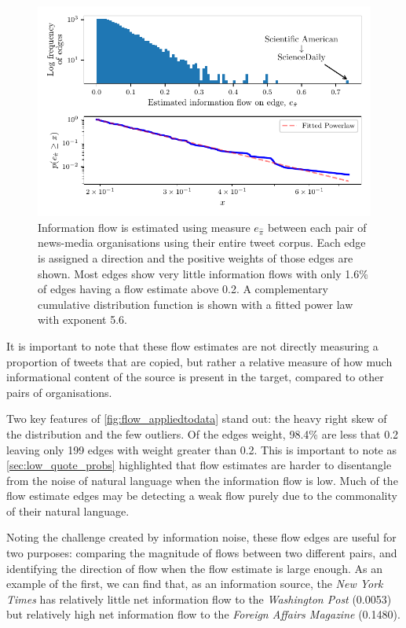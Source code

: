 \begin{figure}[!htbp]
	\centering
	\includegraphics{./chapter3/figs/edge_weights_ccdf.pdf}
	\caption{ Information flow is estimated using measure $e_{\hat{\pi}}$ between each pair of news-media organisations using their entire tweet corpus. Each edge is assigned a direction and the positive weights of those edges are shown. Most edges show very little information flows with only 1.6\% of edges having a flow estimate above 0.2. A complementary cumulative distribution function is shown with a fitted power law with exponent 5.6. }
	\label{fig:flow_appliedtodata}
\end{figure}

It is important to note that these flow estimates are not directly measuring a proportion of tweets that are copied, but rather a relative measure of how much informational content of the source is present in the target, compared to other pairs of organisations. 

Two key features of \autoref{fig:flow_appliedtodata} stand out: the heavy right skew of the distribution and the few outliers. Of the edges weight, 98.4\% are less that 0.2 leaving only 199 edges with weight greater than 0.2. This is important to note as \autoref{sec:low_quote_probs} highlighted that flow estimates are harder to disentangle from the noise of natural language when the information flow is low. Much of the flow estimate edges may be detecting a weak flow purely due to the commonality of their natural language. 

Noting the challenge created by information noise, these flow edges are useful for two purposes: comparing the magnitude of flows between two different pairs, and identifying the direction of flow when the flow estimate is large enough. As an example of the first, we can find that, as an information source, the \emph{New York Times} has relatively little net information flow to the \emph{Washington Post} (0.0053) but relatively high net information flow to the \emph{Foreign Affairs Magazine} (0.1480).

